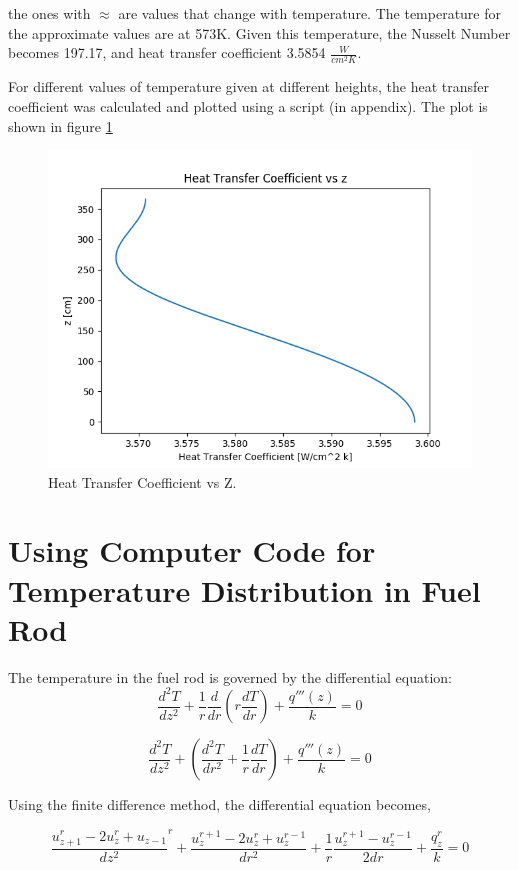 \documentclass[12pt,letterpaper]{article}
\begin{document}
the ones with $\approx$ are values that change with temperature. The temperature
for the approximate values are at 573K. Given this temperature, the Nusselt Number 
becomes 197.17, and heat transfer coefficient 3.5854 $\frac{W}{cm^2 K}$.

For different values of temperature given at different heights, the heat
transfer coefficient was calculated and plotted using a script (in appendix).
The plot is shown in figure \ref{fig:h_z}

\begin{figure}[htbp!]
    \begin{center}
        \includegraphics[scale=0.7]{h_z.png}
    \end{center}
    \caption{Heat Transfer Coefficient vs Z.}
    \label{fig:h_z}
\end{figure}

\section*{Using Computer Code for Temperature Distribution in Fuel Rod}

The temperature in the fuel rod is governed by the differential equation:
\[ \frac{d^2T}{dz^2} + \frac{1}{r} \frac{d}{dr} (r \frac{dT}{dr}) + \frac{q'''(z)}{k} = 0\]

\[ \frac{d^2T}{dz^2} + (\frac{d^2T}{dr^2} + \frac{1}{r} \frac{dT}{dr}) + \frac{q'''(z)}{k} = 0\]

Using the finite difference method, the differential equation becomes,

\[\frac{u_{z+1}^r - 2u_z^r + u_{z-1}}{dz^2}^r + \frac{u^{r+1}_z - 2u^r_z + u^{r-1}_z}{dr^2}
  + \frac{1}{r} \frac{u^{r+1}_z - u^{r-1}_z}{2dr} + \frac{q_z^r}{k} = 0 \]
\end{document}
